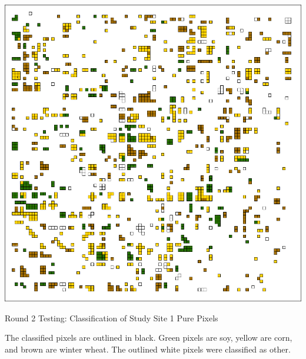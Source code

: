 \begin{ssfigure}
  \centering
  \includegraphics[width=\textwidth]{Graphics/Testing/clip1_MODIS_round2.pdf}
  \caption{Round 2 Testing: Classification of Study Site 1 Pure Pixels}
  \label{fig:ss1r2class}
  The classified pixels are outlined in black. Green pixels are soy, yellow are corn, and brown are winter wheat. The outlined white pixels were classified as other.
\end{ssfigure}


